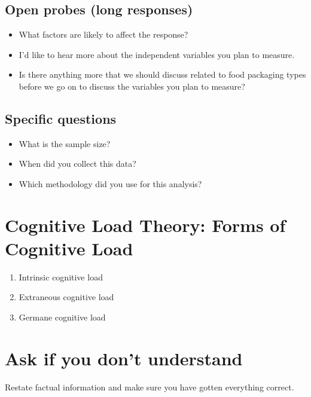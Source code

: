 \documentclass[
  letterpaper,
  DIV=11,
  numbers=noendperiod]{scrreprt}
\begin{document}
\subsection{Open probes (long
responses)}\label{open-probes-long-responses}

\begin{itemize}
\item
  What factors are likely to affect the response?
\item
  I'd like to hear more about the independent variables you plan to
  measure.
\item
  Is there anything more that we should discuss related to food
  packaging types before we go on to discuss the variables you plan to
  measure?
\end{itemize}

\subsection{Specific questions}\label{specific-questions}

\begin{itemize}
\item
  What is the sample size?
\item
  When did you collect this data?
\item
  Which methodology did you use for this analysis?
\end{itemize}

\section{Cognitive Load Theory: Forms of Cognitive
Load}\label{cognitive-load-theory-forms-of-cognitive-load}

\begin{enumerate}
\def\labelenumi{\arabic{enumi}.}
\item
  Intrinsic cognitive load
\item
  Extraneous cognitive load
\item
  Germane cognitive load
\end{enumerate}

\section{Ask if you don't understand}\label{ask-if-you-dont-understand}

Restate factual information and make sure you have gotten everything
correct.
\end{document}
